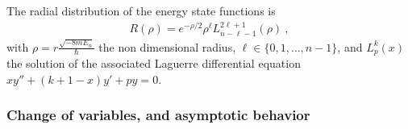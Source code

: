 \documentclass[letterpaper,10pt,english]{jupyterBook}
\begin{document}
\sphinxAtStartPar
The radial distribution of the energy state functions is
\begin{equation*}
\begin{split}R(\rho) = e^{-\rho/2} \rho^{\ell} L^{2 \ell+1}_{n-\ell-1}(\rho) \ ,\end{split}
\end{equation*}
\sphinxAtStartPar
with \(\rho = r \frac{\sqrt{-8 m E_n}}{\hbar}\) the non dimensional radius, \(\ell \in \{ 0, 1, \dots, n-1 \}\), and \(L_{p}^{k}(x)\) the solution of the associated Laguerre differential equation \(x y'' + ( k + 1 - x ) y' + p y = 0\).
\subsubsection*{Change of variables, and asymptotic behavior}
\end{document}
